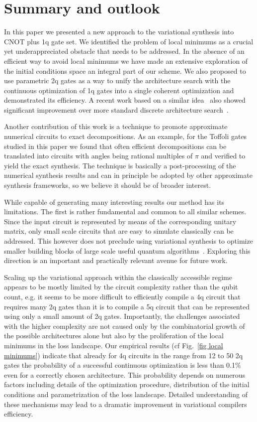 \documentclass[twocolumn, amsfonts, amssymb, aps, nofootinbib]{revtex4-2}
\newcommand{\CX}{\textsf{CNOT }}
\begin{document}
\section{Summary and outlook \label{sec last}}

In this paper we presented a new approach to the variational synthesis into \CX plus 1q gate set. We identified the problem of local minimums as a crucial yet underappreciated obstacle that needs to be addressed. In the absence of an efficient way to avoid local minimums we have made an extensive exploration of the initial conditions space an integral part of our scheme. We also proposed to use parametric 2q gates as a way to unify the architecture search with the continuous optimization of 1q gates into a single coherent optimization and demonstrated its efficiency. A recent work based on a similar idea~\cite{Rakyta2022} also showed significant improvement over more standard discrete architecture search~\cite{Smith2021}.

Another contribution of this work is a technique to promote approximate numerical circuits to exact decompositions. As an example, for the Toffoli gates studied in this paper we found that often efficient decompositions can be translated into circuits with angles being rational multiples of $\pi$ and verified to yield the exact synthesis. The technique is basically a post-processing of the numerical synthesis results and can in principle be adopted by other approximate synthesis frameworks, so we believe it should be of broader interest.

While capable of generating many interesting results our method has its limitations. The first is rather fundamental and common to all similar schemes. Since the input circuit is represented by means of the corresponding unitary matrix, only small scale circuits that are easy to simulate classically can be addressed. This however does not preclude using variational synthesis to optimize smaller building blocks of large scale useful quantum algorithms~\cite{Younis2021}. Exploring this direction is an important and practically relevant avenue for future work.

Scaling up the variational approach within the classically accessible regime appears to be mostly limited by the circuit complexity rather than the qubit count, e.g. it seems to be more difficult to efficiently compile a 4q circuit that requires many 2q gates than it is to compile a 5q circuit that can be represented using only a small amount of 2q gates. Importantly, the challenges associated with the higher complexity are not caused only by the combinatorial growth of the possible architectures alone but also by the proliferation of the local minimums in the loss landscape. Our empirical results (cf Fig.~\ref{fig local minimums}) indicate that already for 4q circuits in the range from 12 to 50 2q gates the probability of a successful continuous optimization is less than 0.1\% even for a correctly chosen architecture. This probability depends on numerous factors including details of the optimization procedure, distribution of the initial conditions and parametrization of the loss landscape. Detailed understanding of these mechanisms may lead to a dramatic improvement in variational compilers efficiency.
\end{document}
